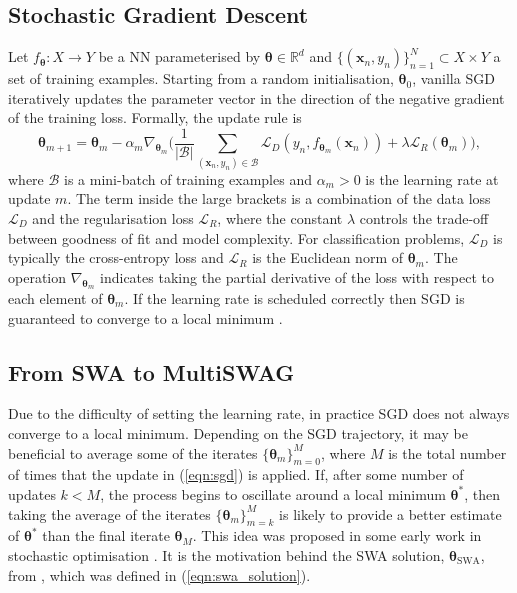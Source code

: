 \documentclass[a4paper,11pt]{article}
\newcommand{\matr}[1]{\mathbf{#1}}
\newcommand{\bgreek}[1]{\boldsymbol{#1}}
\newcommand{\R}{\mathbb R}
\begin{document}

\subsection{Stochastic Gradient Descent}

Let $f_{\bgreek{\theta}}: X \rightarrow Y$ be a NN parameterised by $\bgreek{\theta} \in \R^d$ and  $\{(\matr{x}_n, y_n)\}_{n=1}^{N} \subset X \times Y$ a set of training examples. Starting from a random initialisation, $\bgreek{\theta}_0$, vanilla SGD iteratively updates the parameter vector in the direction of the negative gradient of the training loss. Formally, the update rule is 
\begin{equation}\label{eqn:sgd}
	\bgreek{\theta}_{m+1} = \bgreek{\theta}_m - \alpha_m \nabla_{\bgreek{\theta}_m} \Bigg( \frac{1}{|\mathcal{B}|} \sum_{(\matr{x}_n, y_n) \in \mathcal{B}} \mathcal{L}_D (y_n, f_{\bgreek{\theta}_m}(\matr{x}_n)) + \lambda \mathcal{L}_R (\bgreek{\theta}_m) \Bigg),
\end{equation}
where $\mathcal{B}$ is a mini-batch of training examples and $\alpha_m > 0$ is the learning rate at update $m$. The term inside the large brackets is a combination of the data loss $\mathcal{L}_D$  and the regularisation loss $\mathcal{L}_R$, where the constant $\lambda$ controls the trade-off between goodness of fit and model complexity. For classification problems, $\mathcal{L}_D$ is typically the cross-entropy loss and $\mathcal{L}_R$ is the Euclidean norm of $\bgreek{\theta}_m$. The operation $\nabla_{\bgreek{\theta}_m}$ indicates taking the partial derivative of the loss with respect to each element of $\bgreek{\theta}_m$. If the learning rate is scheduled correctly then SGD is guaranteed to converge to a local minimum \cite{ruder2016}. 

\subsection{From SWA to MultiSWAG}\label{sec:swag}

Due to the difficulty of setting the learning rate, in practice SGD does not always converge to a local minimum. Depending on the SGD trajectory, it may be beneficial to average some of the iterates $\{\bgreek{\theta}_m\}_{m=0}^M$, where $M$ is the total number of times that the update in (\ref{eqn:sgd}) is applied. If, after some number of updates $k < M$, the process begins to oscillate around a local minimum $\bgreek{\theta}^*$, then taking the average of the iterates $\{\bgreek{\theta}_m\}_{m=k}^M$ is likely to provide a better estimate of $\bgreek{\theta}^*$ than the final iterate $\bgreek{\theta}_M$. This idea was proposed in some early work in stochastic optimisation \cite{spall2003}. It is the motivation behind the SWA solution, $\bgreek{\theta}_{\text{SWA}}$, from \cite{izmailov2018}, which was defined in (\ref{eqn:swa_solution}).
\end{document}
